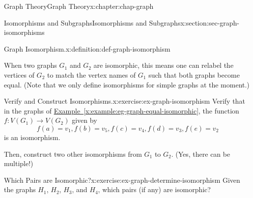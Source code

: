 \documentclass[oneside,10pt,]{book}
\newcommand{\xreffont}{\relax}
\numberwithin{equation}{section}
\begin{document}
\begin{chapterptx}{Graph Theory}{}{Graph Theory}{}{}{x:chapter:chap-graph}
\begin{sectionptx}{Isomorphisms and Subgraphs}{}{Isomorphisms and Subgraphs}{}{}{x:section:sec-graph-isomorphisms}
\begin{definition}{Graph Isomorphism.}{x:definition:def-graph-isomorphism}
\end{definition}
When two graphs \(G_1\) and \(G_2\) are isomorphic, this means one can relabel the vertices of \(G_2\) to match the vertex names of \(G_1\) such that both graphs become equal. (Note that we only define isomorphisms for simple graphs at the moment.)%
\begin{inlineexercise}{Verify and Construct Isomorphisms.}{x:exercise:ex-graph-isomorphism}%
Verify that in the graphs of \hyperref[x:example:eg-graph-equal-isomorphic]{Example~{\xreffont\ref{x:example:eg-graph-equal-isomorphic}}}, the function \(f: V(G_1) \rightarrow V(G_2)\) given by%
\begin{equation*}
f(a) = v_1, f(b) = v_5, f(c) = v_4, f(d) = v_3, f(e) = v_2
\end{equation*}
is an isomorphism.%
\par
Then, construct two other isomorphisms from \(G_1\) to \(G_2\). (Yes, there can be multiple!)%
\end{inlineexercise}%
\begin{inlineexercise}{Which Pairs are Isomorphic?}{x:exercise:ex-graph-determine-isomorphism}%
Given the graphs \(H_1\), \(H_2\), \(H_3\), and \(H_4\), which pairs (if any) are isomorphic?%
\begin{sidebyside}{2}{0.055}{0.055}{0.11}%
\begin{sbspanel}{0.18}%
\end{sbspanel}
\end{sidebyside}
\end{inlineexercise}
\end{sectionptx}
\end{chapterptx}
\end{document}
